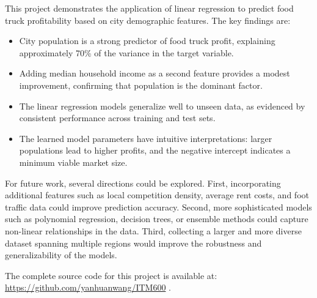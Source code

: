 \documentclass[conference]{IEEEtran}
\begin{document}
This project demonstrates the application of linear regression to predict food truck profitability based on city demographic features. The key findings are:

\begin{itemize}
\item City population is a strong predictor of food truck profit, explaining approximately 70\% of the variance in the target variable.
\item Adding median household income as a second feature provides a modest improvement, confirming that population is the dominant factor.
\item The linear regression models generalize well to unseen data, as evidenced by consistent performance across training and test sets.
\item The learned model parameters have intuitive interpretations: larger populations lead to higher profits, and the negative intercept indicates a minimum viable market size.
\end{itemize}

For future work, several directions could be explored. First, incorporating additional features such as local competition density, average rent costs, and foot traffic data could improve prediction accuracy. Second, more sophisticated models such as polynomial regression, decision trees, or ensemble methods could capture non-linear relationships in the data. Third, collecting a larger and more diverse dataset spanning multiple regions would improve the robustness and generalizability of the models.

The complete source code for this project is available at: \url{https://github.com/yanhuanwang/ITM600} \cite{b1}.
\end{document}
